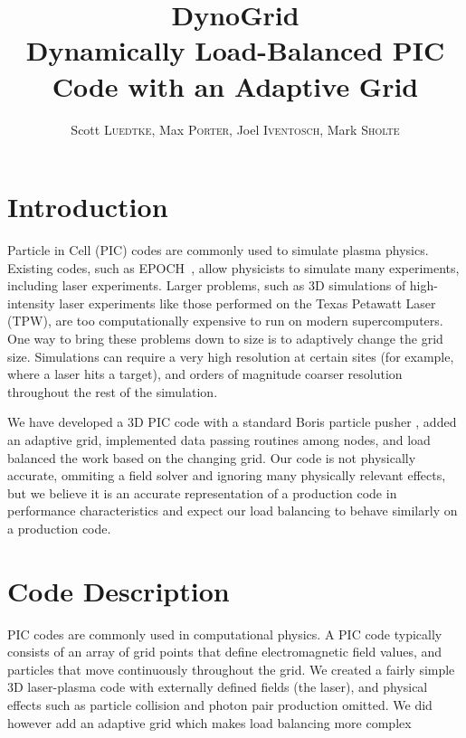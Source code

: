 \documentclass[]{article}
\begin{document}
\title{DynoGrid\\{\Large Dynamically Load-Balanced PIC Code with an Adaptive Grid}}

\author{Scott \textsc{Luedtke}, Max \textsc{Porter}, Joel \textsc{Iventosch}, Mark \textsc{Sholte}}

\maketitle

\section{Introduction}

Particle in Cell (PIC) codes are commonly used to simulate plasma physics.  Existing codes, such as EPOCH~\cite{epoch}, allow physicists to simulate many experiments, including laser experiments.  Larger problems, such as 3D simulations of high-intensity laser experiments like those performed on the Texas Petawatt Laser (TPW), are too computationally expensive to run on modern supercomputers.  One way to bring these problems down to size is to adaptively change the grid size.  Simulations can require a very high resolution at certain sites (for example, where a laser hits a target), and orders of magnitude coarser resolution throughout the rest of the simulation.

We have developed a 3D PIC code with a standard Boris particle pusher \cite{bird}, added an adaptive grid, implemented data passing routines among nodes, and load balanced the work based on the changing grid.  Our code is not physically accurate, ommiting a field solver and ignoring many physically relevant effects, but we believe it is an accurate representation of a production code in performance characteristics and expect our load balancing to behave similarly on a production code.


\section{Code Description}
PIC codes are commonly used in computational physics.  A PIC code typically consists of an array of grid points that define electromagnetic field values, and particles that move continuously throughout the grid.  We created a fairly simple 3D laser-plasma code with externally defined fields (the laser), and physical effects such as particle collision and photon pair production omitted.  We did however add an adaptive grid which makes load balancing more complex
\end{document}
